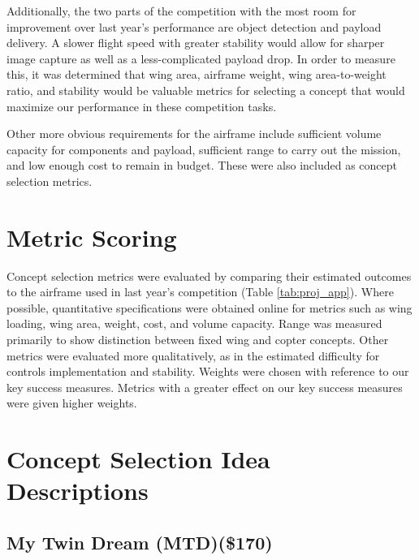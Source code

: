 \documentclass[]{auvsi_doc}
\begin{document}
Additionally, the two parts of the competition with the most room for improvement over last year's performance are object detection and payload delivery. A slower flight speed with greater stability would allow for sharper image capture as well as a less-complicated payload drop. In order to measure this, it was determined that wing area, airframe weight, wing area-to-weight ratio, and stability would be valuable metrics for selecting a concept that would maximize our performance in these competition tasks.

Other more obvious requirements for the airframe include sufficient volume capacity for components and payload, sufficient range to carry out the mission, and low enough cost to remain in budget. These were also included as concept selection metrics.

\section{Metric Scoring}

Concept selection metrics were evaluated by comparing their estimated outcomes to the airframe used in last year's competition (Table \ref{tab:proj_app}). Where possible, quantitative specifications were obtained online for metrics such as wing loading, wing area, weight, cost, and volume capacity. Range was measured primarily to show distinction between fixed wing and copter concepts. Other metrics were evaluated more qualitatively, as in the estimated difficulty for controls implementation and stability. Weights were chosen with reference to our key success measures. Metrics with a greater effect on our key success measures were given higher weights.

\section{Concept Selection Idea Descriptions}

\subsection{My Twin Dream (MTD)(\$170)}
\end{document}
